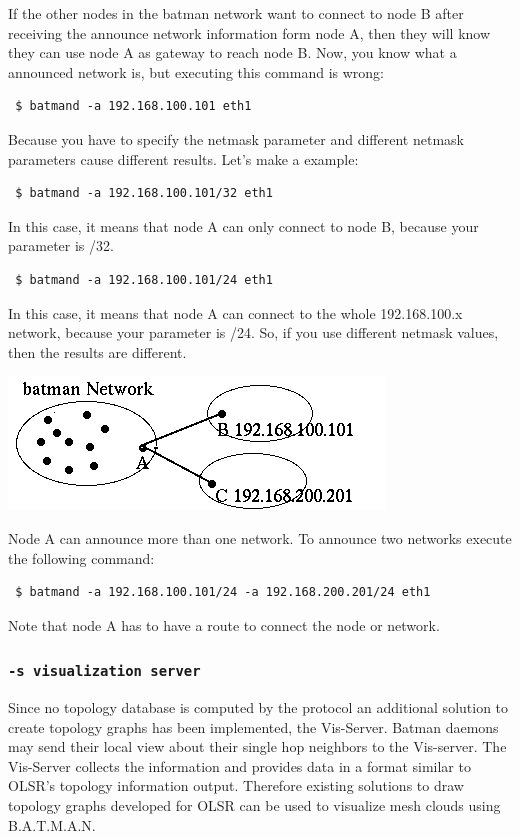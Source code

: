 \documentclass[
	12pt,
	a4paper,
	twoside,
	english,
	headsepline,
	footnosepline,
	automark,
	normalheadings,
	openany,
	cleardoubleplain,
	abstracton,
	idxtotoc,
	liststotoc,
	bibtotoc,
 	BCOR8mm,
]{scrartcl}
\newcommand{\subsubsectionttt}[1]{\subsubsection{\texttt{#1}}}
\begin{document}
If the other nodes in the batman network want to connect to node B after receiving the  announce network information form node A, then they will know they can use node A as  gateway to reach node B. Now, you know what a announced network is, but executing this command is wrong: 
\begin{verbatim}
 $ batmand -a 192.168.100.101 eth1
\end{verbatim}

Because you have to specify the netmask parameter and different netmask parameters cause  different results. Let's make a example:
\begin{verbatim}
 $ batmand -a 192.168.100.101/32 eth1
\end{verbatim}
In this case, it means that node A can only connect to node B, because your parameter is /32.

\begin{verbatim}
 $ batmand -a 192.168.100.101/24 eth1
\end{verbatim}
In this case, it means that node A can connect to the whole 192.168.100.x network, because  your parameter is /24. So, if you use different netmask values, then the results are different.

\begin{center}
\includegraphics[scale=0.8]{multiple_announces}
\end{center}

Node A can  announce more than one network. To announce two networks execute the following  command:
\begin{verbatim}
 $ batmand -a 192.168.100.101/24 -a 192.168.200.201/24 eth1
\end{verbatim}
Note that node A has to have a route to connect the node or network.

\subsubsectionttt{-s visualization server}
Since no topology database is computed by the protocol an additional solution to create  topology graphs has been implemented, the Vis-Server. Batman daemons may send their  local view about their single hop neighbors to the Vis-server. The Vis-Server collects the  information and provides data in a format similar to OLSR's topology information output.  Therefore existing solutions to draw topology graphs developed for OLSR can be used to  visualize mesh clouds using B.A.T.M.A.N.
\end{document}
